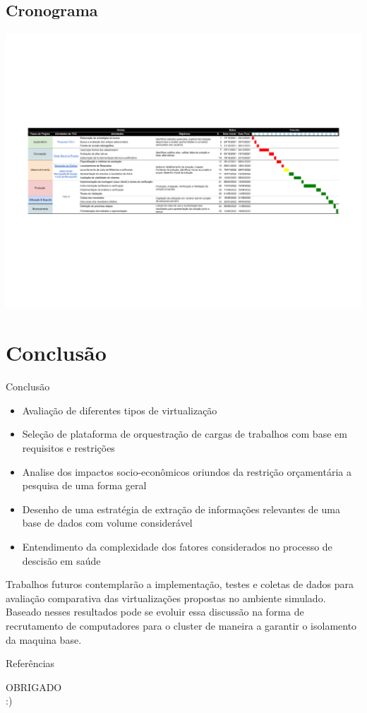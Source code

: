 \documentclass[10pt,brazil]{beamer}
\theoremstyle{definition}
\begin{document}
\subsection{Cronograma}

\begin{frame}[plain]
  \hspace*{-10mm}
  \includegraphics[width=\paperwidth]{TCC cronograma - Sheet1.pdf}
\end{frame} 

\section{Conclusão}

\begin{frame}{Conclusão}
  \begin{itemize}
    \item Avaliação de diferentes tipos de virtualização
    \item Seleção de plataforma de orquestração de cargas de trabalhos com base em requisitos e restrições
    \item Analise dos impactos socio-econômicos oriundos da restrição orçamentária a pesquisa de uma forma geral
    \item Desenho de uma estratégia de extração de informações relevantes de uma base de dados com volume considerável
    \item Entendimento da complexidade dos fatores considerados no processo de descisão em saúde
  \end{itemize}
  Trabalhos futuros contemplarão a implementação, testes e coletas de dados para avaliação comparativa das virtualizações propostas no ambiente simulado. Baseado nesses resultados pode se evoluir essa discussão na forma de recrutamento de computadores para o cluster de maneira a garantir o isolamento da maquina base.
\end{frame} 

\begin{frame}[allowframebreaks]{Referências}
  \small
  
\end{frame}


\begin{frame}
  \centering
  {\color{ros} OBRIGADO\\
    :)}
\end{frame}
\end{document}
